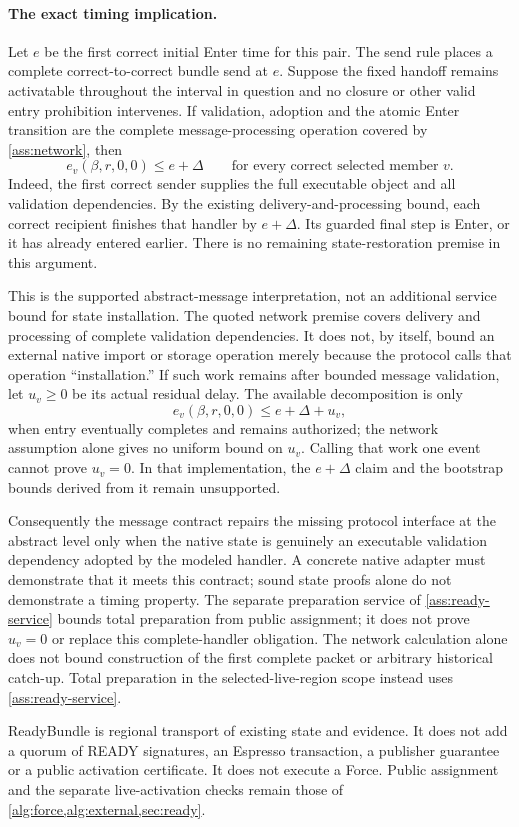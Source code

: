 \paragraph{The exact timing implication.}
Let $e$ be the first correct initial Enter time for this pair. The send
rule places a complete correct-to-correct bundle send at $e$. Suppose the
fixed handoff remains activatable throughout the interval in question
and no closure or other valid entry prohibition intervenes.
If validation, adoption and the atomic Enter transition are the complete
message-processing operation covered by \cref{ass:network}, then
\[
 e_v(\beta,r,0,0)\le e+\Delta
 \qquad\text{for every correct selected member }v.
\]
Indeed, the first correct sender supplies the full executable object and
all validation dependencies. By the existing delivery-and-processing
bound, each correct recipient finishes that handler by $e+\Delta$.
Its guarded final step is Enter, or it has already entered earlier.
There is no remaining state-restoration premise in this argument.

This is the supported abstract-message interpretation, not an additional
service bound for state installation. The quoted network premise covers
delivery and processing of complete validation dependencies. It does not,
by itself, bound an external native import or storage operation merely
because the protocol calls that operation ``installation.'' If such work
remains after bounded message validation, let $u_v\ge0$ be its actual
residual delay. The available decomposition is only
\[
 e_v(\beta,r,0,0)\le e+\Delta+u_v,
\]
when entry eventually completes and remains authorized; the network assumption alone
gives no uniform bound on $u_v$. Calling that work one event cannot prove
$u_v=0$. In that implementation, the $e+\Delta$ claim and the bootstrap
bounds derived from it remain unsupported.

Consequently the message contract repairs the missing protocol interface
at the abstract level only when the native state is genuinely an executable
validation dependency adopted by the modeled handler. A concrete native
adapter must demonstrate that it meets this contract; sound state proofs
alone do not demonstrate a timing property. The separate preparation service of \cref{ass:ready-service} bounds
total preparation from public assignment; it does not prove $u_v=0$
or replace this complete-handler obligation.
The network calculation alone does not bound construction of the first
complete packet or arbitrary historical catch-up. Total preparation in
the selected-live-region scope instead uses \cref{ass:ready-service}.

ReadyBundle is regional transport of existing state and evidence. It does
not add a quorum of READY signatures, an Espresso transaction, a publisher
guarantee or a public activation certificate. It does not execute a Force. Public assignment and the separate
live-activation checks remain those of
\cref{alg:force,alg:external,sec:ready}.
